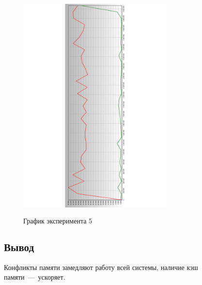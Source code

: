 \begin{figure}[H]
	\caption{График эксперимента 5}
	\includegraphics[width=0.7\textwidth, angle=90]{img/5.pdf}
	\label{img:5}
\end{figure}

\subsection*{Вывод}

Конфликты памяти замедляют работу всей системы, наличие кэш памяти~---~ускоряет.